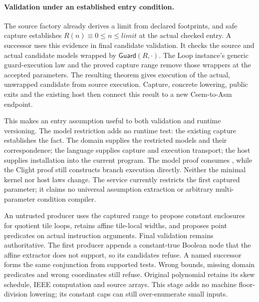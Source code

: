 \paragraph{Validation under an established entry condition.}
The source factory already derives a limit from declared footprints, and safe
capture establishes $R(n)\equiv0\leq n\leq\mathit{limit}$ at the actual checked
entry. A successor uses this evidence in final candidate validation. It checks
the source and actual candidate models wrapped by $\mathsf{Guard}(R,\cdot)$.
The Loop instance's generic guard-execution law and the proved capture range
remove those wrappers at the accepted parameters. The resulting theorem gives
execution of the actual, unwrapped candidate from source execution. Capture,
concrete lowering, public exits and the existing host then connect this result
to a new Csem-to-Asm endpoint.

This makes an entry assumption useful to both validation and runtime versioning.
The model restriction adds no runtime test: the existing capture establishes
the fact. The domain supplies the restricted models and their correspondence;
the language supplies capture and execution transport; the host supplies
installation into the current program. The model proof consumes
, while the Clight proof still constructs
branch execution directly. Neither the minimal kernel nor host laws change.
The service currently restricts the first captured parameter; it claims no
universal assumption extraction or arbitrary multi-parameter condition compiler.

An untrusted producer uses the captured range to propose constant enclosures
for quotient tile loops, retains affine tile-local widths, and proposes point
predicates on actual instruction arguments. Final validation remains
authoritative. The first producer appends a constant-true Boolean node that the
affine extractor does not support, so its candidates refuse. A named successor
forms the same conjunction from supported tests. Wrong bounds, missing domain
predicates and wrong coordinates still refuse. Original polynomial retains its
skew schedule, IEEE computation and source arrays. This stage adds no machine
floor-division lowering; its constant caps can still over-enumerate small inputs.

